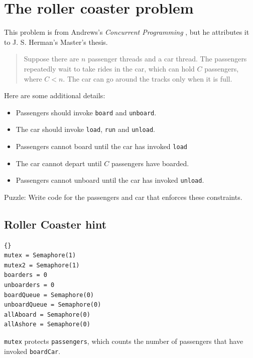 \documentclass{book}
\begin{document}
\section{The roller coaster problem}

This problem is from Andrews's {\em Concurrent
Programming} \cite{andrews}, but he attributes it to J. S. Herman's
Master's thesis.

\begin {quotation}
Suppose there are $n$ passenger threads and a car thread.  The passengers
repeatedly wait to take rides in the car, which can hold $C$ passengers,
where $C<n$.  The car can go around the tracks only when it is full.
\end{quotation}

Here are some additional details:

\begin{itemize}

    \item Passengers should invoke {\tt board} and {\tt unboard}.

    \item The car should invoke {\tt load}, {\tt run} and {\tt unload}.

    \item Passengers cannot board until the car has invoked {\tt load}

    \item The car cannot depart until $C$ passengers have boarded.

    \item Passengers cannot unboard until the car
          has invoked {\tt unload}.

\end{itemize}

Puzzle: Write code for the passengers and car that enforces these
constraints.



\subsection{Roller Coaster hint}

\begin{lstlisting}[title={Roller Coaster hint}]{}
mutex = Semaphore(1)
mutex2 = Semaphore(1)
boarders = 0
unboarders = 0
boardQueue = Semaphore(0)
unboardQueue = Semaphore(0)
allAboard = Semaphore(0)
allAshore = Semaphore(0)
\end{lstlisting}

{\tt mutex} protects {\tt passengers}, which counts the number of
passengers that have invoked {\tt boardCar}.
\end{document}
